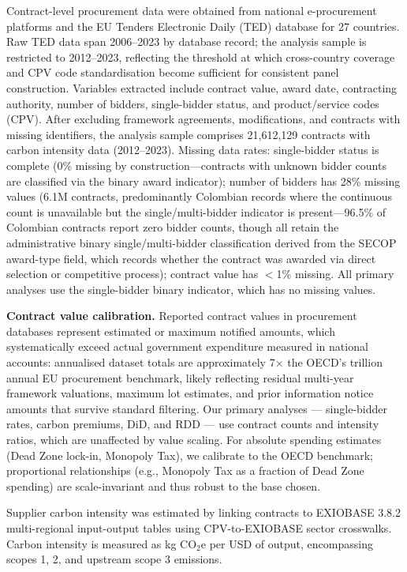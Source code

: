 \documentclass[11pt,a4paper]{article}
\begin{document}
Contract-level procurement data were obtained from national e-procurement platforms and the EU Tenders Electronic Daily (TED) database for 27 countries. Raw TED data span 2006--2023 by database record; the analysis sample is restricted to 2012--2023, reflecting the threshold at which cross-country coverage and CPV code standardisation become sufficient for consistent panel construction. Variables extracted include contract value, award date, contracting authority, number of bidders, single-bidder status, and product/service codes (CPV). After excluding framework agreements, modifications, and contracts with missing identifiers, the analysis sample comprises 21,612,129 contracts with carbon intensity data (2012--2023). Missing data rates: single-bidder status is complete (0\% missing by construction---contracts with unknown bidder counts are classified via the binary award indicator); number of bidders has 28\% missing values (6.1M contracts, predominantly Colombian records where the continuous count is unavailable but the single/multi-bidder indicator is present---96.5\% of Colombian contracts report zero bidder counts, though all retain the administrative binary single/multi-bidder classification derived from the SECOP award-type field, which records whether the contract was awarded via direct selection or competitive process); contract value has $<$1\% missing. All primary analyses use the single-bidder binary indicator, which has no missing values.

\textbf{Contract value calibration.} Reported contract values in procurement databases represent estimated or maximum notified amounts, which systematically exceed actual government expenditure measured in national accounts: annualised dataset totals are approximately 7$\times$ the OECD's  trillion annual EU procurement benchmark\cite{oecd2023procurement}, likely reflecting residual multi-year framework valuations, maximum lot estimates, and prior information notice amounts that survive standard filtering. Our primary analyses --- single-bidder rates, carbon premiums, DiD, and RDD --- use contract counts and intensity ratios, which are unaffected by value scaling. For absolute spending estimates (Dead Zone lock-in, Monopoly Tax), we calibrate to the OECD benchmark; proportional relationships (e.g., Monopoly Tax as a fraction of Dead Zone spending) are scale-invariant and thus robust to the base chosen.

Supplier carbon intensity was estimated by linking contracts to EXIOBASE 3.8.2 multi-regional input-output tables\cite{stadler2018exiobase} using CPV-to-EXIOBASE sector crosswalks. Carbon intensity is measured as kg CO$_2$e per USD of output, encompassing scopes 1, 2, and upstream scope 3 emissions.
\end{document}
